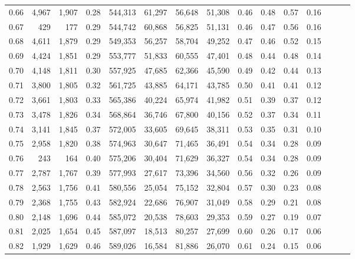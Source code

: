 \begin{tabular}{rrrrrrrrrrrrrrr}
0.66 &   4,967 &  1,907 &  0.28 &  544,313 &   61,297 &   56,648 &   51,308 &  0.46 &  0.48 &  0.57 &      0.16 \\
0.67 &     429 &    177 &  0.29 &  544,742 &   60,868 &   56,825 &   51,131 &  0.46 &  0.47 &  0.56 &      0.16 \\
0.68 &   4,611 &  1,879 &  0.29 &  549,353 &   56,257 &   58,704 &   49,252 &  0.47 &  0.46 &  0.52 &      0.15 \\
0.69 &   4,424 &  1,851 &  0.29 &  553,777 &   51,833 &   60,555 &   47,401 &  0.48 &  0.44 &  0.48 &      0.14 \\
0.70 &   4,148 &  1,811 &  0.30 &  557,925 &   47,685 &   62,366 &   45,590 &  0.49 &  0.42 &  0.44 &      0.13 \\
0.71 &   3,800 &  1,805 &  0.32 &  561,725 &   43,885 &   64,171 &   43,785 &  0.50 &  0.41 &  0.41 &      0.12 \\
0.72 &   3,661 &  1,803 &  0.33 &  565,386 &   40,224 &   65,974 &   41,982 &  0.51 &  0.39 &  0.37 &      0.12 \\
0.73 &   3,478 &  1,826 &  0.34 &  568,864 &   36,746 &   67,800 &   40,156 &  0.52 &  0.37 &  0.34 &      0.11 \\
0.74 &   3,141 &  1,845 &  0.37 &  572,005 &   33,605 &   69,645 &   38,311 &  0.53 &  0.35 &  0.31 &      0.10 \\
0.75 &   2,958 &  1,820 &  0.38 &  574,963 &   30,647 &   71,465 &   36,491 &  0.54 &  0.34 &  0.28 &      0.09 \\
0.76 &     243 &    164 &  0.40 &  575,206 &   30,404 &   71,629 &   36,327 &  0.54 &  0.34 &  0.28 &      0.09 \\
0.77 &   2,787 &  1,767 &  0.39 &  577,993 &   27,617 &   73,396 &   34,560 &  0.56 &  0.32 &  0.26 &      0.09 \\
0.78 &   2,563 &  1,756 &  0.41 &  580,556 &   25,054 &   75,152 &   32,804 &  0.57 &  0.30 &  0.23 &      0.08 \\
0.79 &   2,368 &  1,755 &  0.43 &  582,924 &   22,686 &   76,907 &   31,049 &  0.58 &  0.29 &  0.21 &      0.08 \\
0.80 &   2,148 &  1,696 &  0.44 &  585,072 &   20,538 &   78,603 &   29,353 &  0.59 &  0.27 &  0.19 &      0.07 \\
0.81 &   2,025 &  1,654 &  0.45 &  587,097 &   18,513 &   80,257 &   27,699 &  0.60 &  0.26 &  0.17 &      0.06 \\
0.82 &   1,929 &  1,629 &  0.46 &  589,026 &   16,584 &   81,886 &   26,070 &  0.61 &  0.24 &  0.15 &      0.06 \\

\end{tabular}
